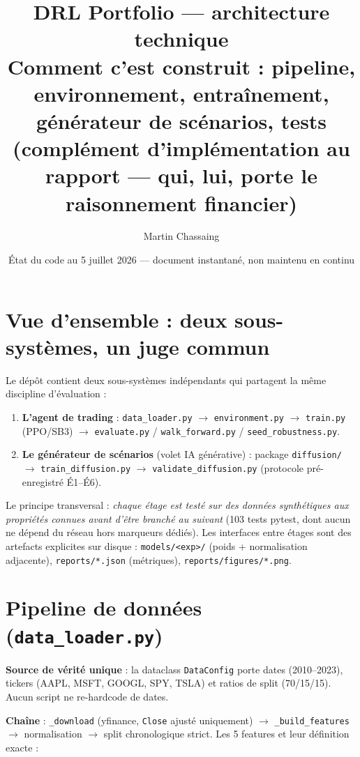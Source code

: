 \documentclass[11pt,a4paper]{article}
\title{\textbf{DRL Portfolio --- architecture technique}\\
\large Comment c'est construit : pipeline, environnement, entraînement,
générateur de scénarios, tests\\
\normalsize (complément d'implémentation au rapport --- qui, lui, porte le
raisonnement financier)}
\author{Martin Chassaing}
\date{État du code au 5 juillet 2026 --- document instantané, non maintenu en continu}
\newcommand{\code}[1]{\texttt{#1}}
\begin{document}
\maketitle

\section{Vue d'ensemble : deux sous-systèmes, un juge commun}

Le dépôt contient deux sous-systèmes indépendants qui partagent la même
discipline d'évaluation :

\begin{enumerate}[itemsep=2pt]
  \item \textbf{L'agent de trading} : \code{data\_loader.py} $\to$
        \code{environment.py} $\to$ \code{train.py} (PPO/SB3) $\to$
        \code{evaluate.py} / \code{walk\_forward.py} / \code{seed\_robustness.py}.
  \item \textbf{Le générateur de scénarios} (volet IA générative) : package
        \code{diffusion/} $\to$ \code{train\_diffusion.py} $\to$
        \code{validate\_diffusion.py} (protocole pré-enregistré É1--É6).
\end{enumerate}

Le principe transversal : \emph{chaque étage est testé sur des données
synthétiques aux propriétés connues avant d'être branché au suivant}
(103 tests pytest, dont aucun ne dépend du réseau hors marqueurs dédiés).
Les interfaces entre étages sont des artefacts explicites sur disque :
\code{models/<exp>/} (poids + normalisation adjacente), \code{reports/*.json}
(métriques), \code{reports/figures/*.png}.

\section{Pipeline de données (\code{data\_loader.py})}

\textbf{Source de vérité unique} : la dataclass \code{DataConfig} porte dates
(2010--2023), tickers (AAPL, MSFT, GOOGL, SPY, TSLA) et ratios de split
(70/15/15). Aucun script ne re-hardcode de dates.

\textbf{Chaîne} : \code{\_download} (yfinance, \code{Close} ajusté uniquement)
$\to$ \code{\_build\_features} $\to$ normalisation $\to$ split chronologique
strict. Les 5 features et leur définition exacte :
\end{document}
